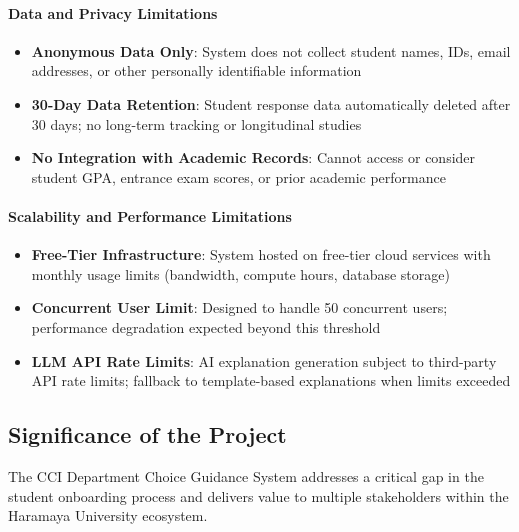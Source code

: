 \documentclass[12pt, a4paper]{article}
\begin{document}
\paragraph{Data and Privacy Limitations}

\begin{itemize}[leftmargin=1.5em, itemsep=3pt]
    \item \textbf{Anonymous Data Only}: System does not collect student names, IDs, email addresses, or other personally identifiable information
    
    \item \textbf{30-Day Data Retention}: Student response data automatically deleted after 30 days; no long-term tracking or longitudinal studies
    
    \item \textbf{No Integration with Academic Records}: Cannot access or consider student GPA, entrance exam scores, or prior academic performance
\end{itemize}

\paragraph{Scalability and Performance Limitations}

\begin{itemize}[leftmargin=1.5em, itemsep=3pt]
    \item \textbf{Free-Tier Infrastructure}: System hosted on free-tier cloud services with monthly usage limits (bandwidth, compute hours, database storage)
    
    \item \textbf{Concurrent User Limit}: Designed to handle 50 concurrent users; performance degradation expected beyond this threshold
    
    \item \textbf{LLM API Rate Limits}: AI explanation generation subject to third-party API rate limits; fallback to template-based explanations when limits exceeded
\end{itemize}

\subsection{Significance of the Project}

The CCI Department Choice Guidance System addresses a critical gap in the student onboarding process and delivers value to multiple stakeholders within the Haramaya University ecosystem.
\end{document}
